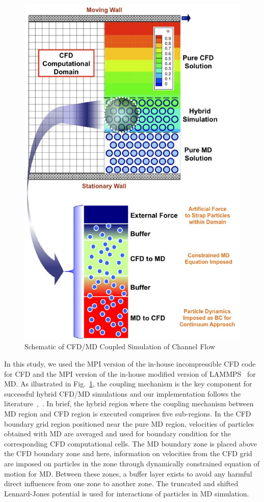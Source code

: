 \documentclass[conference,final]{IEEEtran}
\begin{document}
\begin{figure}
\centering
\includegraphics[scale=0.45]{fig1.eps}
\caption{\small Schematic of CFD/MD Coupled Simulation of Channel Flow}
\label{Fig:Couette}
\end{figure}

In this study, we used the MPI version of the in-house incompressible CFD code~\cite{Lee} for CFD and the MPI version of the in-house modified version of LAMMPS~\cite{LAMMPS} for MD.  As illustrated in Fig.~\ref{Fig:Couette}, the coupling mechanism is the key component for successful hybrid CFD/MD simulations and our implementation follows the literature~\cite{Nie},~\cite{Yen}. In brief, the hybrid region where the coupling mechanism between MD region and CFD region is executed comprises five sub-regions.  In the CFD boundary grid region positioned near the pure MD region, velocities of particles obtained with MD are averaged and used for boundary condition for the corresponding CFD computational cells.  The MD boundary zone is placed above the CFD boundary zone and here, information on velocities from the CFD grid are imposed on particles in the zone through dynamically constrained equation of motion for MD.  Between these zones, a buffer layer exists to avoid any harmful direct influences from one zone to another zone.  The truncated and shifted Lennard-Jones potential is used for interactions of particles in MD simulation.
\end{document}
